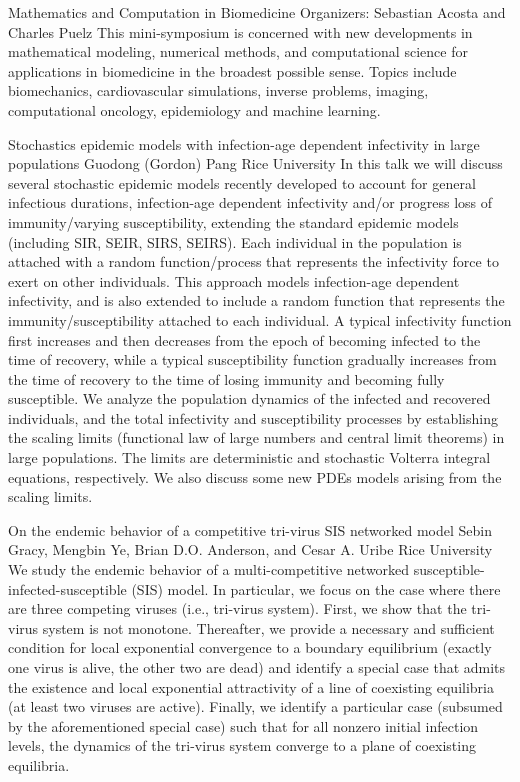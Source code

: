 \label{mini14}

\miniabs
{Mathematics and Computation in Biomedicine}
{Organizers: Sebastian Acosta and Charles Puelz}
{This mini-symposium is concerned with new developments in mathematical modeling, numerical methods, and computational science for applications in biomedicine in the broadest possible sense. Topics include biomechanics, cardiovascular simulations, inverse problems, imaging, computational oncology, epidemiology and machine learning.}


\begin{addmargin}[2em]{0em}
\vspace{2ex}
\abs
{Stochastics epidemic models with infection-age dependent infectivity in large populations}
{Guodong (Gordon) Pang}
{Rice University}
{In this talk we will discuss several stochastic epidemic models recently developed to account for general infectious durations, infection-age dependent infectivity and/or progress loss of immunity/varying susceptibility, extending the standard epidemic models (including SIR, SEIR, SIRS, SEIRS). Each individual in the population is attached with a random function/process that represents the infectivity force to exert on other individuals. This approach models infection-age dependent infectivity, and is also extended to include a random function that represents the immunity/susceptibility attached to each individual. A typical infectivity function first increases and then decreases from the epoch of becoming infected to the time of recovery, while a typical susceptibility function gradually increases from the time of recovery to the time of losing immunity and becoming fully susceptible. We analyze the population dynamics of the infected and recovered individuals, and the total infectivity and susceptibility processes by establishing the scaling limits (functional law of large numbers and central limit theorems) in large populations. The limits are deterministic and stochastic Volterra integral equations, respectively. We also discuss some new PDEs models arising from the scaling limits.}


\vspace{1.5ex}
\abs
{On the endemic behavior of a competitive tri-virus SIS networked model}
{Sebin Gracy, Mengbin Ye, Brian D.O. Anderson, and Cesar A. Uribe}
{Rice University}
{We study the endemic behavior of a multi-competitive networked susceptible-infected-susceptible (SIS) model. In particular, we focus on the case where there are three competing viruses (i.e., tri-virus system). First, we show that the tri-virus system is not monotone. Thereafter, we provide a necessary and sufficient condition for local exponential convergence to a boundary equilibrium (exactly one virus is alive, the other two are dead) and identify a special case that admits the existence and local exponential attractivity of a line of coexisting equilibria (at least two viruses are active). Finally, we identify a particular case (subsumed by the aforementioned special case) such that for all nonzero initial infection levels, the dynamics of the tri-virus system converge to a plane of coexisting equilibria.}



\end{addmargin}
